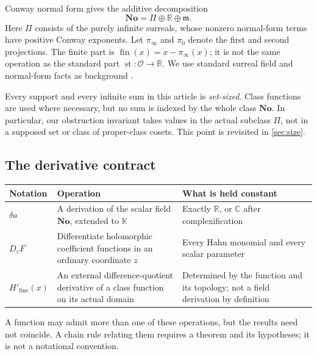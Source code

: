 \documentclass[11pt,letterpaper]{article}
\numberwithin{equation}{section}
\theoremstyle{definition}
\theoremstyle{remark}
\newcommand{\No}{\mathbf{No}}
\newcommand{\K}{\mathbb K}
\newcommand{\R}{\mathbb R}
\newcommand{\C}{\mathbb C}
\newcommand{\OO}{\mathcal O}
\newcommand{\mm}{\mathfrak m}
\newcommand{\PP}{\Pi}
\newcommand{\st}{\operatorname{st}}
\newcommand{\fin}{\operatorname{fin}}
\begin{document}
Conway normal form gives the additive decomposition
\begin{equation}\label{eq:split}
 \No=\PP\oplus\R\oplus\mm.
\end{equation}
Here $\PP$ consists of the purely infinite surreals, whose nonzero normal-form terms have positive Conway exponents. Let $\pi_\infty$ and $\pi_0$ denote the first and second projections. The finite part is $\fin(x)=x-\pi_\infty(x)$; it is not the same operation as the standard part $\st:\OO\to\R$. We use standard surreal field and normal-form facts as background \cite[\S\S2--3]{BM}.

Every support and every infinite sum in this article is \emph{set-sized}. Class functions are used where necessary, but no sum is indexed by the whole class $\No$. In particular, our obstruction invariant takes values in the actual subclass $\PP$, not in a supposed set or class of proper-class cosets. This point is revisited in \cref{sec:size}.

\subsection{The derivative contract}
\begin{center}\small
\begin{tabular}{L{0.18\textwidth}L{0.35\textwidth}L{0.36\textwidth}}
\toprule
Notation & Operation & What is held constant\\
\midrule
$\delta a$ & A derivation of the scalar field $\No$, extended to $\K$ & Exactly $\R$, or $\C$ after complexification\\
$D_zF$ & Differentiate holomorphic coefficient functions in an ordinary coordinate $z$ & Every Hahn monomial and every scalar parameter\\
$H'_{\mathrm{fine}}(x)$ & An external difference-quotient derivative of a class function on its actual domain & Determined by the function and its topology; not a field derivation by definition\\
\bottomrule
\end{tabular}
\end{center}
A function may admit more than one of these operations, but the results need not coincide. A chain rule relating them requires a theorem and its hypotheses; it is not a notational convention.
\end{document}
